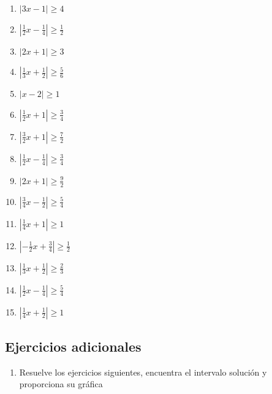 \documentclass[12pt]{article}
\begin{document}
{\begin{enumerate}
\def\labelenumi{\arabic{enumi}.}
\item
  \(|3x-1|\geq 4\)
\item
  \(|\frac{1}{2}x-\frac{1}{4}|\geq\frac{1}{2}\)
\item
  \(|2x+1|\geq 3\)
\item
  \(|\frac{1}{3}x+\frac{1}{2}|\geq\frac{5}{6}\)
\item
  \(|x-2|\geq 1\)
\item
  \(|\frac{1}{2}x+1|\geq\frac{3}{4}\)
\item
  \(|\frac{3}{2}x+1|\geq\frac{7}{2}\)
\item
  \(|\frac{1}{2}x-\frac{1}{4}|\geq\frac{3}{4}\)
\item
  \(|2x+1|\geq\frac{9}{2}\)
\item
  \(|\frac{3}{4}x-\frac{1}{2}|\geq\frac{5}{4}\)
\item
  \(|\frac{1}{4}x+1|\geq 1\)
\item
  \(|-\frac{1}{2}x+\frac{3}{4}|\geq\frac{1}{2}\)
\item
  \(|\frac{1}{3}x+\frac{1}{2}|\geq\frac{2}{3}\)
\item
  \(|\frac{1}{2}x-\frac{1}{4}|\geq\frac{5}{4}\)
\item
  \(|\frac{1}{4}x+\frac{1}{2}|\geq 1\)
\end{enumerate}

\subsection{Ejercicios adicionales}

\begin{enumerate}
\def\labelenumi{\arabic{enumi}.}
\item
  Resuelve los ejercicios siguientes, encuentra el intervalo solución y
  proporciona su gráfica


\end{enumerate}}
\end{document}
